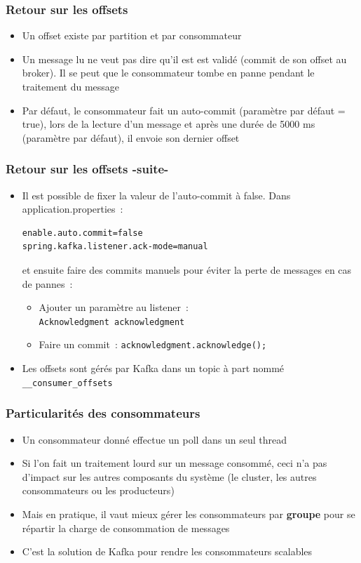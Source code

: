 \documentclass{beamer}
\begin{document}
\begin{frame}[fragile]
	\frametitle{Retour sur les offsets}
	\begin{itemize}
		\item Un offset existe par partition et par consommateur
		\item Un message lu ne veut pas dire qu'il est est validé (commit de son offset au broker). Il se peut que le consommateur tombe en panne pendant le traitement du message
		\item Par défaut, le consommateur fait un auto-commit (paramètre par défaut = true), lors de la lecture d'un message et après une durée de 5000 ms (paramètre par défaut), il envoie son dernier offset
	\end{itemize}
\end{frame} 

\begin{frame}[fragile]
\frametitle{Retour sur les offsets -suite-}
\begin{itemize}		
		\item Il est possible de fixer la valeur de l'auto-commit à false. Dans application.properties~:
\begin{lstlisting}
enable.auto.commit=false
spring.kafka.listener.ack-mode=manual
\end{lstlisting}
		et ensuite faire des commits manuels pour éviter la perte de messages en cas de pannes~:
	\begin{itemize}		
		\item Ajouter un paramètre au listener~:\\ \texttt{Acknowledgment acknowledgment}
		\item Faire un commit~: \texttt{acknowledgment.acknowledge();}
	\end{itemize}
\item Les offsets sont gérés par Kafka dans un topic à part nommé \texttt{\_\_consumer\_offsets}
	\end{itemize}
\end{frame} 

\begin{frame}[fragile]
	\frametitle{Particularités des consommateurs}
	\begin{itemize}
		\item Un consommateur donné effectue un poll dans un seul thread
		\item Si l'on fait un traitement lourd sur un message consommé, ceci n'a pas d'impact sur les autres composants du système (le cluster, les autres consommateurs ou les producteurs)
		\item Mais en pratique, il vaut mieux gérer les consommateurs par \textbf{groupe} pour se répartir la charge de consommation de messages
		\item C'est la solution de Kafka pour rendre les consommateurs scalables
	\end{itemize}
\end{frame} 
\end{document}
